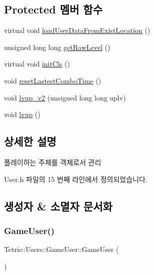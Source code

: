 \subsection*{Protected 멤버 함수}
\begin{DoxyCompactItemize}
\item 
virtual void \hyperlink{class_tetris_1_1_users_1_1_game_user_a730bd78525a4802685b53c67b38eca0c}{load\+User\+Data\+From\+Exist\+Location} ()
\item 
unsigned long long \hyperlink{class_tetris_1_1_users_1_1_game_user_a3e232d2f4a0610e51136bec11453858b}{get\+Raw\+Level} ()
\item 
virtual void \hyperlink{class_tetris_1_1_users_1_1_game_user_a8ec8ca43d0c6d0dc2c2e049ae1b4d316}{init\+Cls} ()
\item 
void \hyperlink{class_tetris_1_1_users_1_1_game_user_a442b35545b13a23dca566cf1b43eb82d}{reset\+Lastest\+Combo\+Time} ()
\item 
void \hyperlink{class_tetris_1_1_users_1_1_game_user_aacc605ed22d2b982a106659ef94fb3c9}{lvup\+\_\+v2} (unsigned long long uplv)
\item 
void \hyperlink{class_tetris_1_1_users_1_1_game_user_ad7bdfbb3fc18ca0a1cdfcb34faaed6ff}{lvup} ()
\end{DoxyCompactItemize}


\subsection{상세한 설명}
플레이하는 주체를 객체로서 관리 

User.\+h 파일의 15 번째 라인에서 정의되었습니다.



\subsection{생성자 \& 소멸자 문서화}
\mbox{\label{class_tetris_1_1_users_1_1_game_user_af9d7bed8e019ca4348995337ea7339b7}} 
\subsubsection{\texorpdfstring{Game\+User()}{GameUser()}\hspace{0.1cm}{\footnotesize\ttfamily [1/4]}}
{\footnotesize\ttfamily Tetris\+::\+Users\+::\+Game\+User\+::\+Game\+User (\begin{DoxyParamCaption}{ }\end{DoxyParamCaption})\hspace{0.3cm}{\ttfamily [inline]}}



